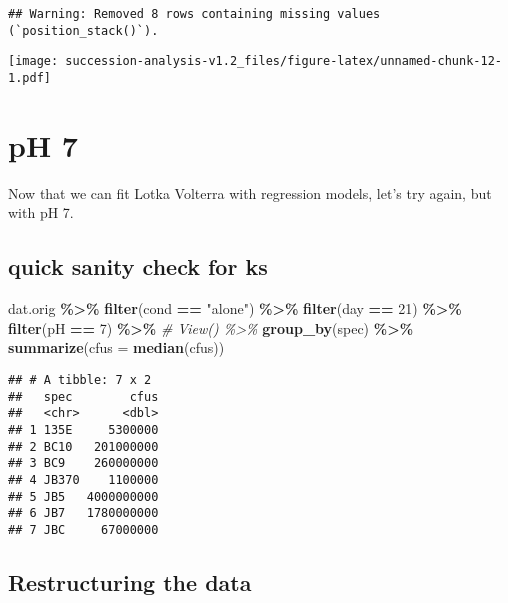\documentclass[
]{article}
\newenvironment{Shaded}{\begin{snugshade}}{\end{snugshade}}
\newcommand{\AttributeTok}[1]{\textcolor[rgb]{0.13,0.29,0.53}{#1}}
\newcommand{\CommentTok}[1]{\textcolor[rgb]{0.56,0.35,0.01}{\textit{#1}}}
\newcommand{\DecValTok}[1]{\textcolor[rgb]{0.00,0.00,0.81}{#1}}
\newcommand{\FunctionTok}[1]{\textcolor[rgb]{0.13,0.29,0.53}{\textbf{#1}}}
\newcommand{\NormalTok}[1]{#1}
\newcommand{\SpecialCharTok}[1]{\textcolor[rgb]{0.81,0.36,0.00}{\textbf{#1}}}
\newcommand{\StringTok}[1]{\textcolor[rgb]{0.31,0.60,0.02}{#1}}
\begin{document}
\begin{verbatim}
## Warning: Removed 8 rows containing missing values (`position_stack()`).
\end{verbatim}

\texttt{[image: succession-analysis-v1.2\_files/figure-latex/unnamed-chunk-12-1.pdf]}

\hypertarget{ph-7}{%
\section{pH 7}\label{ph-7}}

Now that we can fit Lotka Volterra with regression models, let's try
again, but with pH 7.

\hypertarget{quick-sanity-check-for-ks}{%
\subsection{quick sanity check for ks}\label{quick-sanity-check-for-ks}}

\begin{Shaded}
\begin{Highlighting}[]
\NormalTok{dat.orig }\SpecialCharTok{\%\textgreater{}\%}  
  \FunctionTok{filter}\NormalTok{(cond }\SpecialCharTok{==} \StringTok{"alone"}\NormalTok{) }\SpecialCharTok{\%\textgreater{}\%}  
  \FunctionTok{filter}\NormalTok{(day }\SpecialCharTok{==} \DecValTok{21}\NormalTok{) }\SpecialCharTok{\%\textgreater{}\%} 
  \FunctionTok{filter}\NormalTok{(pH }\SpecialCharTok{==}  \DecValTok{7}\NormalTok{) }\SpecialCharTok{\%\textgreater{}\%}
  \CommentTok{\# View() \%\textgreater{}\% }
  \FunctionTok{group\_by}\NormalTok{(spec) }\SpecialCharTok{\%\textgreater{}\%} 
  \FunctionTok{summarize}\NormalTok{(}\AttributeTok{cfus =} \FunctionTok{median}\NormalTok{(cfus))}
\end{Highlighting}
\end{Shaded}

\begin{verbatim}
## # A tibble: 7 x 2
##   spec        cfus
##   <chr>      <dbl>
## 1 135E     5300000
## 2 BC10   201000000
## 3 BC9    260000000
## 4 JB370    1100000
## 5 JB5   4000000000
## 6 JB7   1780000000
## 7 JBC     67000000
\end{verbatim}

\hypertarget{restructuring-the-data}{%
\subsection{Restructuring the data}\label{restructuring-the-data}}
\end{document}
